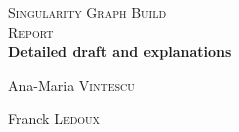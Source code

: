 \documentclass[a4paper]{report}
\begin{document}
\begin{titlepage}
\begin{center}



\textsc{\LARGE Singularity Graph Build}\\[1.5cm]

\textsc{\Large Report}\\[0.5cm]


{ \huge \bfseries Detailed draft and explanations \\[0.4cm] }



\begin{minipage}{0.4\textwidth}
\begin{flushleft} \large
Ana-Maria \textsc{Vintescu}
\end{flushleft}
\end{minipage}
\begin{minipage}{0.4\textwidth}
\begin{flushright} \large
Franck \textsc{Ledoux}
\end{flushright}
\end{minipage}


\date{} %

\end{center}
\end{titlepage}


\date{} %



\renewcommand{\thesection}{\arabic{section}}
\end{document}
